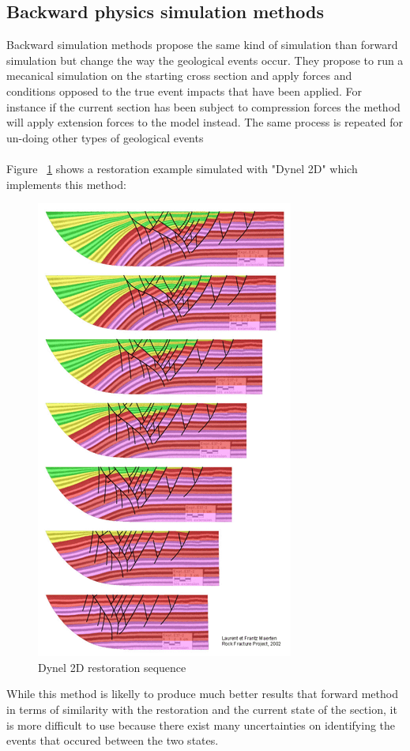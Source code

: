 \documentclass[12pt, a4paper]{report} %
\begin{document}
\subsection{Backward physics simulation methods}
Backward simulation methods propose the same kind of simulation than forward simulation but change the way the geological events occur. They propose to run a mecanical simulation on the starting cross section and apply forces and conditions opposed to the true event impacts that have been applied. For instance if the current section has been subject to compression forces the method will apply extension forces to the model instead. The same process is repeated for un-doing other types of geological events\\\\
 Figure ~\ref{dyn2} shows a restoration example simulated with "Dynel 2D" \cite{Dynel} which implements this method:
 \begin{figure}[H]
	\centering
	\includegraphics[scale=0.6]{dynel2D.png}
	\caption{Dynel 2D restoration sequence}
	\label{dyn2}
\end{figure}

 While this method is likelly to produce much better results that forward method in terms of similarity with the restoration and the current state of the section, it is more difficult to use because there exist many uncertainties on identifying the events that occured between the two states.
\end{document}
